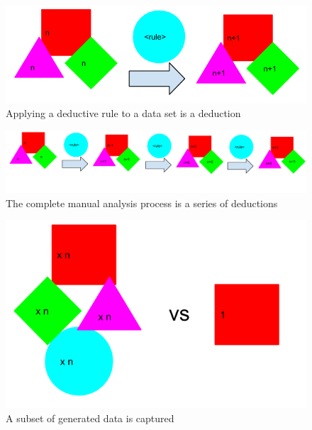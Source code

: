 \begin{figure}
  \includegraphics[scale=0.5]{figures/deduction}
  \caption{Applying a deductive rule to a data set is a deduction}
  \label{deduction}
\end{figure}

\begin{figure}
  \includegraphics[scale=0.5]{figures/deductive_process}
  \caption{The complete manual analysis process is a series of deductions}
  \label{deductive_process}
\end{figure}

\begin{figure}
  \includegraphics[scale=0.5]{figures/data_captured}
  \caption{A subset of generated data is captured}
  \label{data_captured}
\end{figure}

